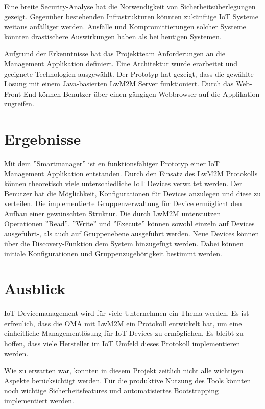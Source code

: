 Eine breite Security-Analyse hat die Notwendigkeit von Sicherheitsüberlegungen gezeigt. Gegenüber bestehenden Infrastrukturen könnten zukünftige IoT Systeme weitaus anfälliger werden. Ausfälle und Kompromittierungen solcher Systeme könnten drastischere Auswirkungen haben als bei heutigen Systemen. 

Aufgrund der Erkenntnisse hat das Projektteam Anforderungen an die Management Applikation definiert. Eine Architektur wurde erarbeitet und geeignete Technologien ausgewählt. Der Prototyp hat gezeigt, dass die gewählte Lösung mit einem Java-basierten LwM2M Server funktioniert. Durch das Web-Front-End können Benutzer über einen gängigen Webbrowser auf die Applikation zugreifen.
\section*{Ergebnisse}
Mit dem ''Smartmanager'' ist en funktionsfähiger Prototyp einer IoT Management Applikation entstanden. Durch den Einsatz des LwM2M Protokolls können theoretisch viele unterschiedliche IoT Devices verwaltet werden. Der Benutzer hat die Möglichkeit, Konfigurationen für Devices anzulegen und diese zu verteilen. Die implementierte Gruppenverwaltung für Device ermöglicht den Aufbau einer gewünschten Struktur. Die durch LwM2M unterstützen Operationen ''Read'', ''Write'' und ''Execute'' können sowohl einzeln auf Devices ausgeführt-, als auch auf Gruppenebene ausgeführt werden. Neue Devices können über die Discovery-Funktion dem System hinzugefügt werden. Dabei können initiale Konfigurationen und Gruppenzugehörigkeit bestimmt werden.
\section*{Ausblick}
IoT Devicemanagement wird für viele Unternehmen ein Thema werden. Es ist erfreulich, dass die OMA mit LwM2M ein Protokoll entwickelt hat, um eine einheitliche Managementlösung für IoT Devices zu ermöglichen. Es bleibt zu hoffen, dass viele Hersteller im IoT Umfeld dieses Protokoll implementieren werden.

Wie zu erwarten war, konnten in diesem Projekt zeitlich nicht alle wichtigen Aspekte berücksichtigt werden. Für die produktive Nutzung des Tools könnten noch wichtige Sicherheitsfeatures und automatisiertes Bootstrapping implementiert werden.